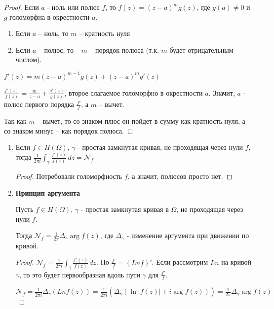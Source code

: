 \begin{proof}

    Если $a$ - ноль или полюс $f$, то $f(z) = (z - a)^m g(z)$, где $g(a) \neq 0$ и
    $g$ голоморфна в окрестности $a$.

    \begin{enumerate}
        \item Если $a$ -- ноль, то $m$ -- кратность нуля
        \item Если $a$ -- полюс, то $-m$ -- порядок полюса (т.к. $m$ будет отрицательным числом).
    \end{enumerate}

    $f'(z) = m(z - a)^{m - 1} g(z) + (z - a)^m g'(z)$

    $\frac{f'(z)}{f(z)} = \frac{m}{z - a} + \frac{g'(z)}{g(z)}$, второе слагаемое голоморфно в окрестности $a$. Значит,
    $a$ - полюс первого порядка $\frac{f'}{f}$, а $m$ -- вычет.
    
    Так как $m$ -- вычет, то со знаком плюс он пойдет в сумму как кратность нуля, а со знаком минус -- как порядок полюса.
\end{proof}

\begin{consequence}
    \begin{enumerate}
        \item {            
            Если $f \in H(\Omega)$, $\gamma$ - простая замкнутая кривая, не проходящая через нули $f$, тогда
            $\frac{1}{2\pi i} \int_{\gamma} \frac{f'(z)}{f(z)} \, dz = \mathcal{N}_f$

            \begin{proof}
                Потребовали голоморфность $f$, а значит, полюсов просто нет.
            \end{proof}
        }
        \item {
            \textbf{Принцип аргумента}

            Пусть $f \in H(\Omega)$, $\gamma$ - простая замкнутая кривая в $\Omega$, не проходящая через
            нули $f$.

            Тогда $\mathcal{N}_f = \frac{1}{2\pi} \Delta_{\gamma} \arg f(z)$, где $\Delta_{\gamma}$ - изменение аргумента
            при движении по кривой.

            
            \begin{proof}
                $\mathcal{N}_f = \frac{1}{2\pi i} \int_{\gamma} \frac{f'(z)}{f(z)} \, dz$. Но $\frac{f'}{f} = (Ln f)'$.
                Если рассмотрим $Ln$ на кривой $\gamma$, то это будет первообразная вдоль пути $\gamma$ для $\frac{f'}{f}$.

                $\mathcal{N}_f = \frac{1}{2\pi i} \Delta_\gamma (Ln f(z)) = \frac{1}{2 \pi i} (\Delta_\gamma
                (\ln |f(z)| + i\arg f(z))) = \frac{1}{2\pi} \Delta_{\gamma} \arg f(z)$
            \end{proof}
        }
    \end{enumerate}
\end{consequence}

